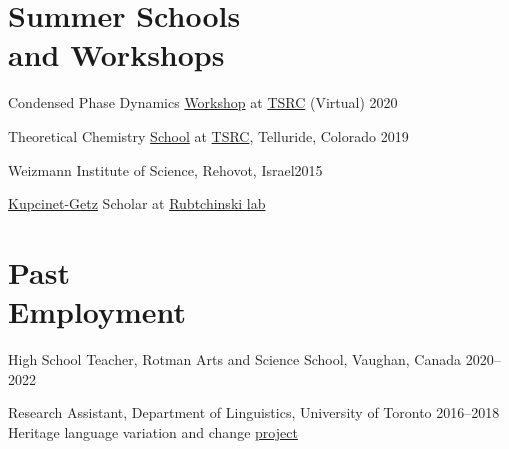 \documentclass[margin,line]{res}
\newenvironment{list1}{
  \begin{list}{\ding{113}}{%
      \setlength{\itemsep}{0in}
      \setlength{\parsep}{0in} \setlength{\parskip}{0in}
      \setlength{\topsep}{0in} \setlength{\partopsep}{0in} 
      \setlength{\leftmargin}{0.17in}}}{\end{list}}
\begin{document}
\begin{resume}

\section{\sc Summer Schools\\and Workshops}
%
%
Condensed Phase Dynamics  \href{https://meetings.telluridescience.org/meetings/workshop-details?wid=829}{Workshop} at \href{https://www.telluridescience.org/schools/tellurideschoolontheoreticalchemistry}{TSRC} (Virtual) \hfill {2020}

\vspace*{-1mm}

Theoretical Chemistry \href{https://meetings.telluridescience.org/meetings/workshop-details?wid=775}{School} at \href{https://www.telluridescience.org/schools/tellurideschoolontheoreticalchemistry}{TSRC}, Telluride, Colorado \hfill {2019}

\vspace*{-1mm}

Weizmann Institute of Science, Rehovot, Israel\hfill{2015}\\
\vspace*{-.1in}
\begin{list1}
\item[] \href{https://www.weizmann.ac.il/feinberg/admissions/kupcinet-getz-international-summer-school/about-program-0}{Kupcinet-Getz} Scholar at \href{https://www.weizmann.ac.il/Organic_Chemistry/Rybtchinski/}{Rubtchinski lab}
\end{list1}

\section{\sc Past\\Employment}
High School Teacher, Rotman Arts and Science School, Vaughan, Canada \hfill{2020--2022}

\vspace*{-1mm}

Research Assistant, Department of Linguistics, University of Toronto \hfill{2016--2018}\\
Heritage language variation and change \href{https://ngn.artsci.utoronto.ca/HLVC/0_0_home.php}{project}


\end{resume}
\end{document}

